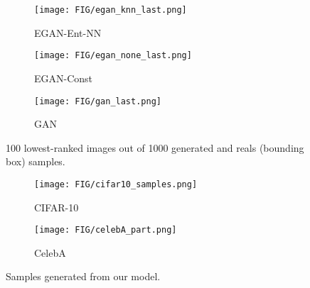 \documentclass[a4paper]{article}
\begin{document}
\begin{figure}[t!]
  \begin{subfigure}[b]{\linewidth}
    \texttt{[image: FIG/egan\_knn\_last.png]}
    \caption{EGAN-Ent-NN}
    \label{fig:nist_egan_knn_last}
  \end{subfigure}
  \hfill
  \begin{subfigure}[b]{\linewidth}
    \texttt{[image: FIG/egan\_none\_last.png]}
    \caption{EGAN-Const}
    \label{fig:nist_egan_none_last}
  \end{subfigure}
  \begin{subfigure}[b]{\linewidth}
    \texttt{[image: FIG/gan\_last.png]}
    \caption{GAN}
    \label{fig:nist_gan_last}
  \end{subfigure}

  \caption{100 lowest-ranked images out of 1000 generated and reals (bounding box) samples. }
 \label{fig:nist_result_last}
\vspace{-0.6em}
\end{figure}











\begin{figure}[h]
  \begin{subfigure}[b]{0.45\textwidth}
    \texttt{[image: FIG/cifar10\_samples.png]}
    \caption{CIFAR-10}
    \label{fig:cifar10}
  \end{subfigure}
  \hfill
  \begin{subfigure}[b]{0.45\textwidth}
    \texttt{[image: FIG/celebA\_part.png]}
    \caption{CelebA}
    \label{fig:celebA}
  \end{subfigure}
  \caption{Samples generated from our model.}
 \label{figure:cifar10_celebA}
\vspace{-0.6em}
\end{figure}
\end{document}

